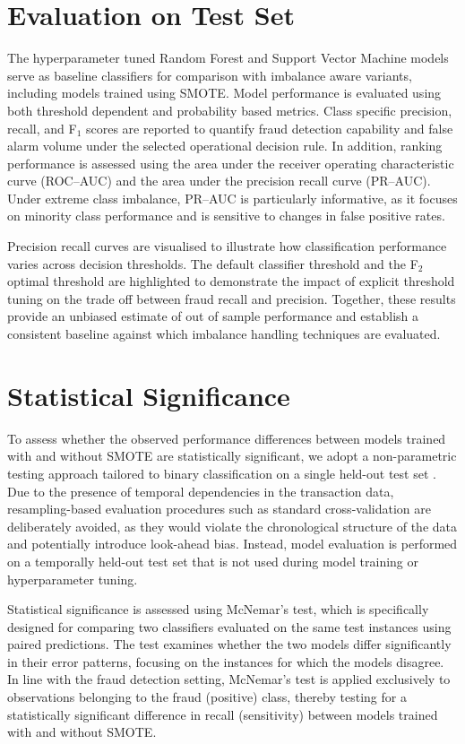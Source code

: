 \documentclass[oneside,12pt,parskip=half,american,numbers=noenddot]{scrreprt}
\begin{document}
\section{Evaluation on Test Set}
The hyperparameter tuned Random Forest and Support Vector Machine models serve as baseline classifiers for comparison with imbalance aware variants, including models trained using SMOTE. Model performance is evaluated using both threshold dependent and probability based metrics. Class specific precision, recall, and F$_1$ scores are reported to quantify fraud detection capability and false alarm volume under the selected operational decision rule. In addition, ranking performance is assessed using the area under the receiver operating characteristic curve (ROC--AUC) and the area under the precision recall curve (PR--AUC). Under extreme class imbalance, PR--AUC is particularly informative, as it focuses on minority class performance and is sensitive to changes in false positive rates.

Precision recall curves are visualised to illustrate how classification performance varies across decision thresholds. The default classifier threshold and the F$_2$ optimal threshold are highlighted to demonstrate the impact of explicit threshold tuning on the trade off between fraud recall and precision. Together, these results provide an unbiased estimate of out of sample performance and establish a consistent baseline against which imbalance handling techniques are evaluated.



\section{Statistical Significance}
\label{statistical_significance}


To assess whether the observed performance differences between models trained with and without SMOTE are statistically significant, we adopt a non-parametric testing approach tailored to binary classification on a single held-out test set \parencite{rainio_evaluation_2024}. Due to the presence of temporal dependencies in the transaction data, resampling-based evaluation procedures such as standard cross-validation are deliberately avoided, as they would violate the chronological structure of the data and potentially introduce look-ahead bias. Instead, model evaluation is performed on a temporally held-out test set that is not used during model training or hyperparameter tuning.

Statistical significance is assessed using McNemar’s test, which is specifically designed for comparing two classifiers evaluated on the same test instances using paired predictions. The test examines whether the two models differ significantly in their error patterns, focusing on the instances for which the models disagree. In line with the fraud detection setting, McNemar’s test is applied exclusively to observations belonging to the fraud (positive) class, thereby testing for a statistically significant difference in recall (sensitivity) between models trained with and without SMOTE.
\end{document}
